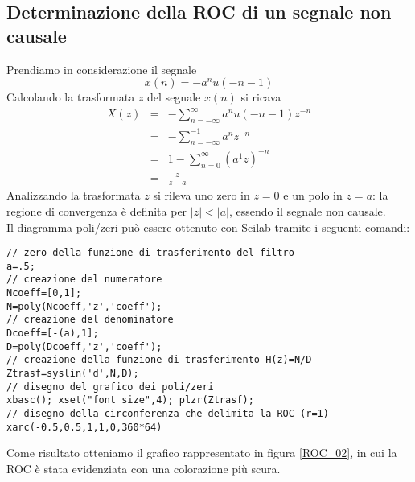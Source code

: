 \subsection{Determinazione della ROC di un segnale non causale}
Prendiamo in considerazione il segnale
\begin{displaymath}
x(n)=-a^nu(-n-1)
\end{displaymath}
Calcolando la trasformata $z$ del segnale ${x(n)}$ si ricava
\begin{eqnarray*}
X(z) & = & -\sum_{n=-\infty}^\infty a^{n}u(-n-1)z^{-n} \\
     & = & -\sum_{n=-\infty}^{-1} a^{n}z^{-n} \\
     & = & 1-\sum_{n=0}^\infty (a^{1}z)^{-n} \\
     & = & \frac{z}{z-a}
\end{eqnarray*}
Analizzando la trasformata $z$ si rileva uno zero in $z=0$ e un polo in $z=a$: la regione di convergenza \`e definita per $|z|<|a|$, essendo il segnale non causale. \\
Il diagramma poli/zeri pu\`o essere ottenuto con Scilab tramite i seguenti comandi:
\begin{verbatim}
// zero della funzione di trasferimento del filtro
a=.5;
// creazione del numeratore
Ncoeff=[0,1];
N=poly(Ncoeff,'z','coeff');
// creazione del denominatore
Dcoeff=[-(a),1];
D=poly(Dcoeff,'z','coeff');
// creazione della funzione di trasferimento H(z)=N/D
Ztrasf=syslin('d',N,D);
// disegno del grafico dei poli/zeri
xbasc(); xset("font size",4); plzr(Ztrasf);
// disegno della circonferenza che delimita la ROC (r=1)
xarc(-0.5,0.5,1,1,0,360*64)
\end{verbatim}
Come risultato otteniamo il grafico rappresentato in figura \ref{ROC_02}, in cui la ROC \`e stata evidenziata con una colorazione pi\`u scura.


